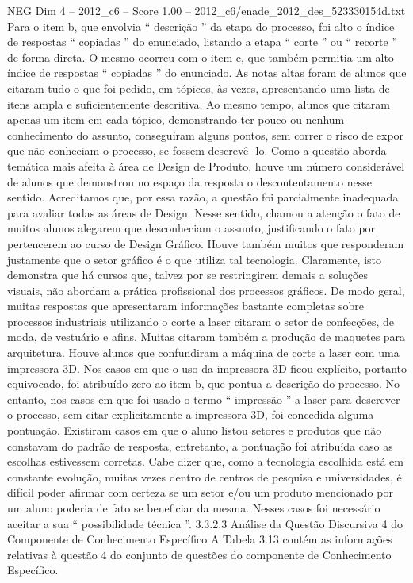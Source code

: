 \begin{textsample}{NEG Dim 4 – 2012\_c6 – Score 1.00 – 2012\_c6/enade\_2012\_des\_523330154d.txt}
Para o item b, que envolvia “ descrição ” da etapa do processo, foi alto o índice de respostas “ copiadas ” do enunciado, listando a etapa “ corte ” ou “ recorte ” de forma direta.
O mesmo ocorreu com o item c, que também permitia um alto índice de respostas “ copiadas ” do enunciado.
As notas altas foram de alunos que citaram tudo o que foi pedido, em tópicos, às vezes, apresentando uma lista de itens ampla e suficientemente descritiva.
Ao mesmo tempo, alunos que citaram apenas um item em cada tópico, demonstrando ter pouco ou nenhum conhecimento do assunto, conseguiram alguns pontos, sem correr o risco de expor que não conheciam o processo, se fossem descrevê -lo.
Como a questão aborda temática mais afeita à área de Design de Produto, houve um número considerável de alunos que demonstrou no espaço da resposta o descontentamento nesse sentido.
Acreditamos que, por essa razão, a questão foi parcialmente inadequada para avaliar todas as áreas de Design.
Nesse sentido, chamou a atenção o fato de muitos alunos alegarem que desconheciam o assunto, justificando o fato por pertencerem ao curso de Design Gráfico.
Houve também muitos que responderam justamente que o setor gráfico é o que utiliza tal tecnologia.
Claramente, isto demonstra que há cursos que, talvez por se restringirem demais a soluções visuais, não abordam a prática profissional dos processos gráficos.
De modo geral, muitas respostas que apresentaram informações bastante completas sobre processos industriais utilizando o corte a laser citaram o setor de confecções, de moda, de vestuário e afins.
Muitas citaram também a produção de maquetes para arquitetura.
Houve alunos que confundiram a máquina de corte a laser com uma impressora 3D.
Nos casos em que o uso da impressora 3D ficou explícito, portanto equivocado, foi atribuído zero ao item b, que pontua a descrição do processo.
No entanto, nos casos em que foi usado o termo “ impressão ” a laser para descrever o processo, sem citar explicitamente a impressora 3D, foi concedida alguma pontuação.
Existiram casos em que o aluno listou setores e produtos que não constavam do padrão de resposta, entretanto, a pontuação foi atribuída caso as escolhas estivessem corretas.
Cabe dizer que, como a tecnologia escolhida está em constante evolução, muitas vezes dentro de centros de pesquisa e universidades, é difícil poder afirmar com certeza se um setor e/ou um produto mencionado por um aluno poderia de fato se beneficiar da mesma.
Nesses casos foi necessário aceitar a sua “ possibilidade técnica ”. 3.3.2.3 Análise da Questão Discursiva 4 do Componente de Conhecimento Específico A Tabela 3.13 contém as informações relativas à questão 4 do conjunto de questões do componente de Conhecimento Específico.

\end{textsample}
